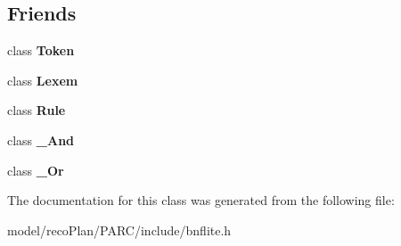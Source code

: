 \subsection*{Friends}
\begin{DoxyCompactItemize}
\item 
\mbox{\label{classbnf_1_1___base_a48f5c1ca47af8dc65eca7e0274de96e2}} 
class {\bfseries Token}
\item 
\mbox{\label{classbnf_1_1___base_a5e39c58451938ac9fc35e0ac18674f12}} 
class {\bfseries Lexem}
\item 
\mbox{\label{classbnf_1_1___base_a6c87f8640d92f86217b1b5ac79943269}} 
class {\bfseries Rule}
\item 
\mbox{\label{classbnf_1_1___base_abc37899b09eb024e8e57c00ec8fba682}} 
class {\bfseries \+\_\+\+And}
\item 
\mbox{\label{classbnf_1_1___base_abc2ecc13a8a23716fb474fcc5d47a88f}} 
class {\bfseries \+\_\+\+Or}
\end{DoxyCompactItemize}


The documentation for this class was generated from the following file\+:\begin{DoxyCompactItemize}
\item 
model/reco\+Plan/\+P\+A\+R\+C/include/bnflite.\+h\end{DoxyCompactItemize}
